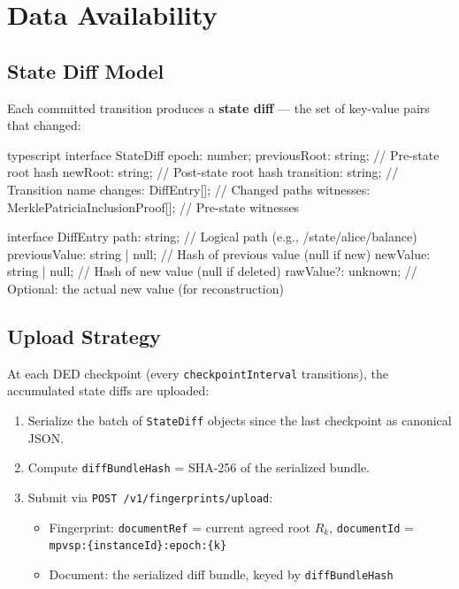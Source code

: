 \documentclass[11pt,a4paper]{article}
\begin{document}
\section{Data Availability}
\label{sec:da}

\subsection{State Diff Model}

Each committed transition produces a \textbf{state diff} --- the set of
key-value pairs that changed:

\begin{codebox}{typescript}
interface StateDiff {
  epoch: number;
  previousRoot: string;  // Pre-state root hash
  newRoot: string;       // Post-state root hash
  transition: string;    // Transition name
  changes: DiffEntry[];  // Changed paths
  witnesses: MerklePatriciaInclusionProof[];  // Pre-state witnesses
}

interface DiffEntry {
  path: string;          // Logical path (e.g., /state/alice/balance)
  previousValue: string | null;  // Hash of previous value (null if new)
  newValue: string | null;       // Hash of new value (null if deleted)
  rawValue?: unknown;    // Optional: the actual new value (for reconstruction)
}
\end{codebox}

\subsection{Upload Strategy}

At each DED checkpoint (every \texttt{checkpointInterval} transitions), the
accumulated state diffs are uploaded:

\begin{enumerate}[nosep]
  \item Serialize the batch of \texttt{StateDiff} objects since the last
    checkpoint as canonical JSON.
  \item Compute \texttt{diffBundleHash} = SHA-256 of the serialized bundle.
  \item Submit via \texttt{POST /v1/fingerprints/upload}:
    \begin{itemize}[nosep]
      \item Fingerprint: \texttt{documentRef} = current agreed root $R_k$,
        \texttt{documentId} = \texttt{mpvsp:\{instanceId\}:epoch:\{k\}}
      \item Document: the serialized diff bundle, keyed by
        \texttt{diffBundleHash}
    \end{itemize}
\end{enumerate}
\end{document}
